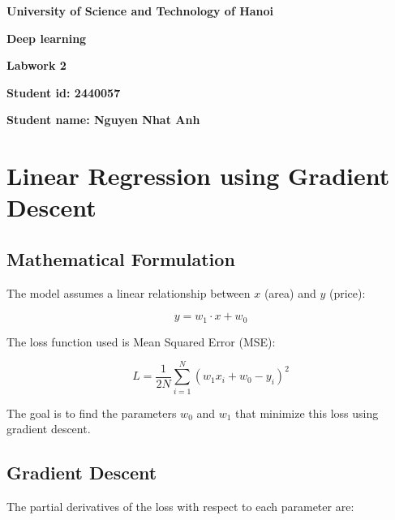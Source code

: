 \documentclass[12pt]{article}
\begin{document}
\thispagestyle{empty} %
\begin{center}
    \vspace{7pt}
    \fontsize{18pt}{17pt}\selectfont 
    \textbf{University of Science and Technology of Hanoi}
    \vspace{7pt}
\end{center}

\vspace{90pt}

\begin{center}
    \fontsize{30pt}{17pt}\selectfont 
    \textbf{Deep learning} 
    \vspace{50pt}

    \fontsize{20pt}{17pt}\selectfont 
    \textbf{Labwork 2}
    \vspace{50pt}


    \fontsize{17pt}{17pt}\selectfont
    \textbf{{Student id: }{2440057}}
    \vspace{15pt}

    \fontsize{17pt}{17pt}\selectfont
    \textbf{{Student name: }{Nguyen Nhat Anh}}
    \vspace{15pt}
    
\end{center}

\newpage
\section{Linear Regression using Gradient Descent}
\subsection{Mathematical Formulation}
The model assumes a linear relationship between $x$ (area) and $y$ (price):

\[
y = w_1 \cdot x + w_0
\]

The loss function used is Mean Squared Error (MSE):

\[
L = \frac{1}{2N} \sum_{i=1}^N (w_1 x_i + w_0 - y_i)^2
\]

The goal is to find the parameters $w_0$ and $w_1$ that minimize this loss using gradient descent.

\subsection{Gradient Descent}

The partial derivatives of the loss with respect to each parameter are:
\end{document}
